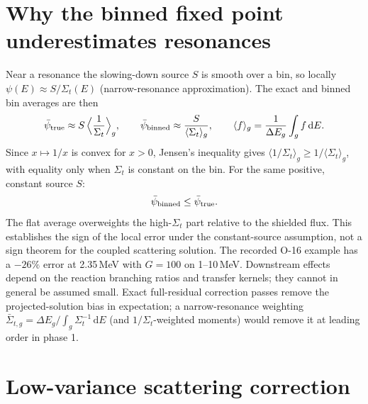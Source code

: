 \documentclass[11pt]{article}
\newcommand{\dd}{\,\mathrm{d}}
\newcommand{\Sigt}{\Sigma_t}
\begin{document}
\section{Why the binned fixed point underestimates resonances}

Near a resonance the slowing-down source $S$ is smooth over a bin, so locally
$\psi(E)\approx S/\Sigt(E)$ (narrow-resonance approximation). The exact and binned bin
averages are then
\begin{equation}
  \bar\psi_{\rm true}\approx S\,\Big\langle\frac{1}{\Sigt}\Big\rangle_g,\qquad
  \bar\psi_{\rm binned}\approx\frac{S}{\langle\Sigt\rangle_g},
  \qquad \langle f\rangle_g=\frac1{\Delta E_g}\int_g f\dd E .
\end{equation}
Since $x\mapsto1/x$ is convex for $x>0$, Jensen's inequality gives
$\langle1/\Sigt\rangle_g\ge 1/\langle\Sigt\rangle_g$, with equality only when $\Sigt$
is constant on the bin. For the same positive, constant source $S$:
\begin{equation}
  \bar\psi_{\rm binned}\le\bar\psi_{\rm true}.
\end{equation}
The flat average overweights the high-$\Sigt$ part relative to the shielded flux.
This establishes the sign of the local error under the constant-source assumption,
not a sign theorem for the coupled scattering solution. The recorded O-16 example
has a $-26\%$ error at 2.35\,MeV with $G=100$ on 1--10\,MeV.
Downstream effects depend on the reaction branching ratios and transfer kernels;
they cannot in general be assumed small. Exact full-residual correction passes
remove the projected-solution bias in expectation; a narrow-resonance
weighting $\bar\Sigma_{t,g}=\Delta E_g/\int_g\Sigt^{-1}\dd E$ (and $1/\Sigt$-weighted
moments) would remove it at leading order in phase 1.

\section{Low-variance scattering correction}
\end{document}
